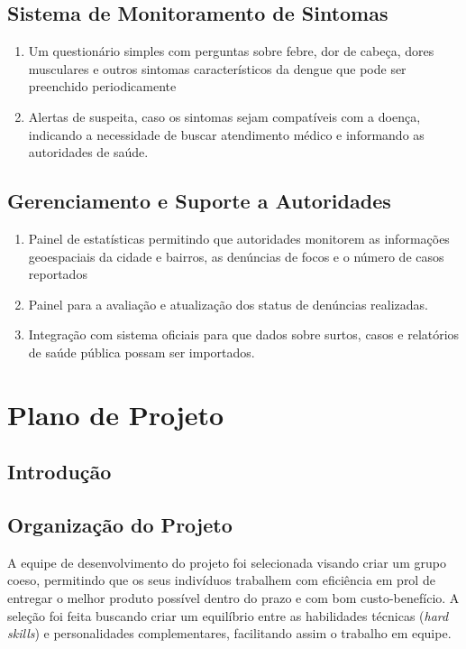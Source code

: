 \documentclass[a5paper, 12pt]{article}
\begin{document}
\subsection{Sistema de Monitoramento de Sintomas}
\begin{enumerate}
    \item Um questionário simples com perguntas sobre febre, dor de cabeça, dores musculares e outros sintomas característicos da dengue que pode ser preenchido periodicamente
    \item Alertas de suspeita, caso os sintomas sejam compatíveis com a doença, indicando a necessidade de buscar atendimento médico e informando as autoridades de saúde.
\end{enumerate}
\subsection{Gerenciamento e Suporte a Autoridades}
\begin{enumerate}
    \item Painel de estatísticas permitindo que autoridades monitorem as informações geoespaciais da cidade e bairros, as denúncias de focos e o número de casos  reportados
    \item Painel para a avaliação e atualização dos status de denúncias realizadas.
    \item Integração com sistema oficiais para que dados sobre surtos, casos e relatórios de saúde pública possam ser importados.
\end{enumerate}

\newpage
\section{Plano de Projeto}

\subsection{Introdução}

\subsection{Organização do Projeto}
A equipe de desenvolvimento do projeto foi selecionada visando criar um grupo coeso, permitindo que os seus indivíduos trabalhem com eficiência em prol de entregar o melhor produto possível dentro do prazo e com bom custo-benefício. A seleção foi feita buscando criar um equilíbrio entre as habilidades técnicas (\textit{hard skills}) e personalidades complementares, facilitando assim o trabalho em equipe.
\end{document}
